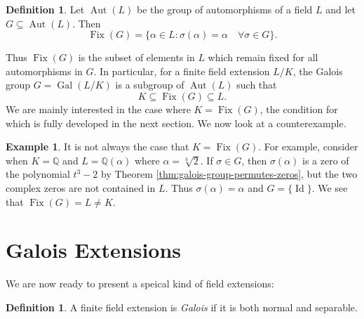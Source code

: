 \documentclass[12pt]{article}
\theoremstyle{definition}
\newtheorem{definition}[theorem]{Definition}
\newtheorem{example}[theorem]{Example}
\newcommand{\Gal}{\operatorname{Gal}}
\newcommand{\Aut}{\operatorname{Aut}}
\newcommand{\Fix}{\operatorname{Fix}}
\newcommand{\Id}{\operatorname{Id}}
\newcommand{\Q}{\mathbb Q}
\begin{document}
\begin{definition}
    Let $\Aut(L)$ be the group of automorphisms of a field $L$ and let $G \subseteq \Aut(L)$. Then $$\Fix(G) = \{ \alpha \in L : \sigma(\alpha) = \alpha \quad \forall \sigma \in G \}. $$
\end{definition}
Thus $\Fix(G)$ is the subset of elements in $L$ which remain fixed for all automorphisms in $G$. In particular, for a finite field extension $L/ K$, the Galois group $G = \Gal(L / K)$ is a subgroup of $\Aut(L)$ such that $$K \subseteq \Fix(G) \subseteq L. $$ We are mainly interested in the case where $K = \Fix(G)$, the condition for which is fully developed in the next section. We now look at a counterexample. 

\begin{example}
    It is not always the case that $K = \Fix(G)$. For example, consider when $K = \Q$ and $L = \Q (\alpha)$ where $\alpha = \sqrt[3]{2}$. If $\sigma \in G$, then $\sigma(\alpha)$ is a zero of the polynomial $t^3 - 2$ by Theorem \ref{thm:galois-group-permutes-zeros}, but the two complex zeros are not contained in $L$. Thus $\sigma(\alpha) = \alpha$ and $G = \{ \Id \}$. We see that $\Fix(G) = L \neq K$. 
\end{example}

\section{Galois Extensions}

We are now ready to present a speical kind of field extensions:

\begin{definition}
    A finite field extension is \textit{Galois} if it is both normal and separable. 
\end{definition}

\end{document}
